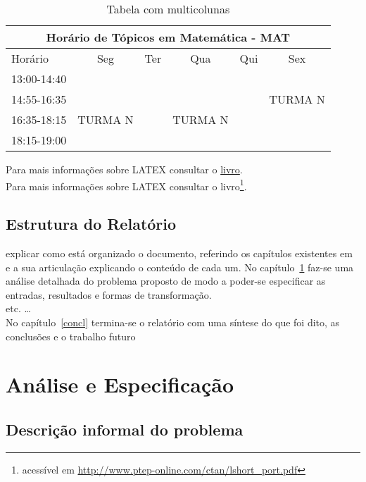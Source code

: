 \documentclass[11pt,a4paper]{report}%
\begin{document}
\begin{table}[h!] %
\begin{center}
\begin{tabular}{|l||c|c|c|c|c|}
\hline
\multicolumn{6}{|c|}{\textbf{Horário de Tópicos em Matemática - MAT}}\\
\hline
Horário    &Seg &Ter &Qua &Qui &Sex\\
\hline\hline
13:00-14:40&    &    &    &    & \\
\hline
14:55-16:35&    &    &    &    &TURMA N \\
\hline
16:35-18:15&TURMA N & &TURMA N & & \\
\hline
18:15-19:00& & & & & \\
\hline
\end{tabular}
\caption{Tabela com multicolunas}
\end{center}
\end{table}

\newpage

Para mais informações sobre LATEX consultar o
 \href{http://www.ptep-online.com/ctan/lshort_port.pdf}{livro}.\\

 Para mais informações sobre LATEX
 consultar o livro\footnote{acessível em \url{http://www.ptep-online.com/ctan/lshort_port.pdf}}.


\section*{Estrutura do Relatório}
explicar como está organizado o documento, referindo os capítulos existentes em~\cite{deransart:1990}
e a sua articulação explicando o conteúdo de cada um.
No capítulo~\ref{chap:analiseEspecificacao} faz-se uma análise detalhada do problema proposto
de modo a poder-se especificar  as entradas, resultados e formas de transformação.\\
etc. \ldots\\ %
No capítulo~\ref{concl} termina-se o relatório com uma síntese do que foi dito,
as conclusões e o trabalho futuro



\chapter{Análise e Especificação} \label{chap:analiseEspecificacao} %
\section{Descrição informal do problema} \label{sec:descricaoProblema} %
\end{document}
